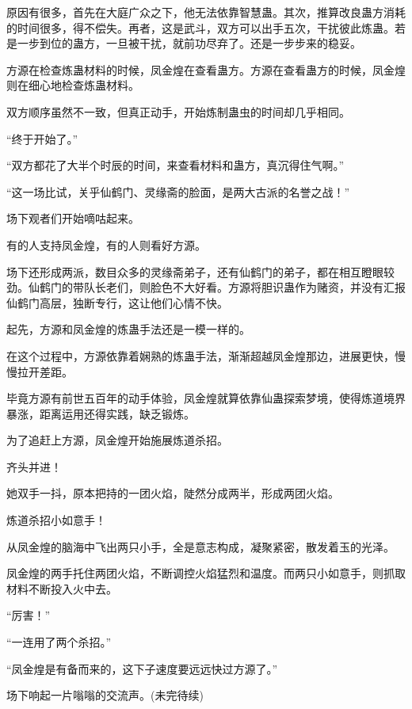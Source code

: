 \begin{this_body}
原因有很多，首先在大庭广众之下，他无法依靠智慧蛊。其次，推算改良蛊方消耗的时间很多，得不偿失。再者，这是武斗，双方可以出手五次，干扰彼此炼蛊。若是一步到位的蛊方，一旦被干扰，就前功尽弃了。还是一步步来的稳妥。

方源在检查炼蛊材料的时候，凤金煌在查看蛊方。方源在查看蛊方的时候，凤金煌则在细心地检查炼蛊材料。

双方顺序虽然不一致，但真正动手，开始炼制蛊虫的时间却几乎相同。

“终于开始了。”

“双方都花了大半个时辰的时间，来查看材料和蛊方，真沉得住气啊。”

“这一场比试，关乎仙鹤门、灵缘斋的脸面，是两大古派的名誉之战！”

场下观者们开始嘀咕起来。

有的人支持凤金煌，有的人则看好方源。

场下还形成两派，数目众多的灵缘斋弟子，还有仙鹤门的弟子，都在相互瞪眼较劲。仙鹤门的带队长老们，则脸色不大好看。方源将胆识蛊作为赌资，并没有汇报仙鹤门高层，独断专行，这让他们心情不快。

起先，方源和凤金煌的炼蛊手法还是一模一样的。

在这个过程中，方源依靠着娴熟的炼蛊手法，渐渐超越凤金煌那边，进展更快，慢慢拉开差距。

毕竟方源有前世五百年的动手体验，凤金煌就算依靠仙蛊探索梦境，使得炼道境界暴涨，距离运用还得实践，缺乏锻炼。

为了追赶上方源，凤金煌开始施展炼道杀招。

齐头并进！

她双手一抖，原本把持的一团火焰，陡然分成两半，形成两团火焰。

炼道杀招小如意手！

从凤金煌的脑海中飞出两只小手，全是意志构成，凝聚紧密，散发着玉的光泽。

凤金煌的两手托住两团火焰，不断调控火焰猛烈和温度。而两只小如意手，则抓取材料不断投入火中去。

“厉害！”

“一连用了两个杀招。”

“凤金煌是有备而来的，这下子速度要远远快过方源了。”

场下响起一片嗡嗡的交流声。(未完待续)

\end{this_body}

